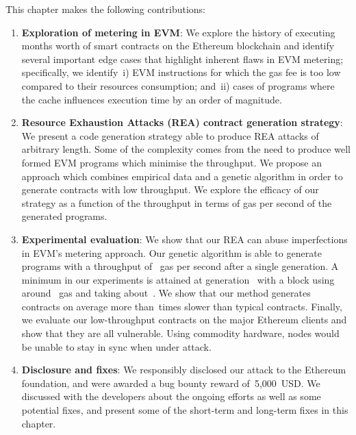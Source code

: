 This chapter makes the following contributions:
\begin{enumerate}
    \item \textbf{Exploration of metering in EVM}: We explore the history of executing~\empirical{\Months} months worth of smart contracts on the Ethereum blockchain and identify several important edge cases that highlight inherent flaws in EVM metering; specifically, we identify~i) EVM instructions for which the gas fee is too low compared to their resources consumption; and~ii) cases of programs where the cache influences execution time by an order of magnitude.
    
	
    \item \textbf{Resource Exhaustion Attacks (REA) contract generation strategy}: We present a code generation strategy able to produce REA attacks of arbitrary length. Some of the complexity comes from the need to produce well formed EVM programs which minimise the throughput. We propose an approach which combines empirical data and a genetic algorithm in order to generate contracts with low throughput. We explore the efficacy of our strategy as a function of the throughput in terms of gas per second of the generated programs.
	\item \textbf{Experimental evaluation}:
	We show that our REA can abuse imperfections in EVM's metering approach. Our genetic algorithm is able to generate programs with a throughput of~ gas per second after a single generation. A minimum in our experiments is attained at generation~ with a block using around~ gas and taking about~. We show that our method generates contracts on average more than~\Slowdown times slower than typical contracts. Finally, we evaluate our low-throughput contracts on the major Ethereum clients and show that they are all vulnerable. Using commodity hardware, nodes would be unable to stay in sync when under attack.
\item \textbf{Disclosure and fixes}:
  We responsibly disclosed our attack to the Ethereum foundation, and were awarded a bug bounty reward of~5,000~USD. We discussed with the developers about the ongoing efforts as well as some potential fixes, and present some of the short-term and long-term fixes in this chapter.
\end{enumerate}

